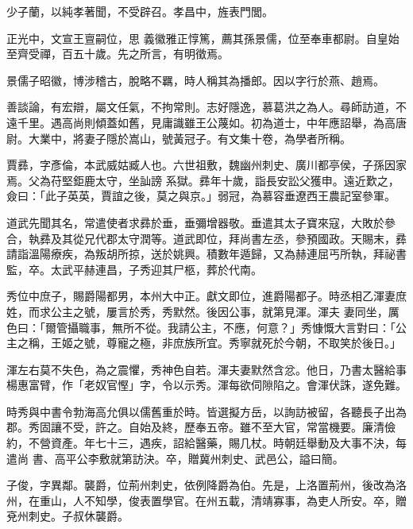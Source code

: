 \begin{pinyinscope}
 少子蘭，以純孝著聞，不受辟召。孝昌中，旌表門閭。



 正光中，文宣王亶嗣位，思
 義徽雅正惇篤，薦其孫景儒，位至奉車都尉。自皇始至齊受禪，百五十歲。先之所言，有明徵焉。



 景儒子昭徽，博涉稽古，脫略不羈，時人稱其為播郎。因以字行於燕、趙焉。



 善談論，有宏辯，屬文任氣，不拘常則。志好隱逸，慕葛洪之為人。尋師訪道，不遠千里。遇高尚則傾蓋如舊，見庸識雖王公蔑如。初為道士，中年應詔舉，為高唐尉。大業中，將妻子隱於嵩山，號黃冠子。有文集十卷，為學者所稱。



 賈彞，字彥倫，本武威姑臧人也。六世祖敷，魏幽州刺史、廣川都亭侯，子孫因家焉。父為苻堅鉅鹿太守，坐訕謗
 系獄。彞年十歲，詣長安訟父獲申。遠近歎之，僉曰：「此子英英，賈誼之後，莫之與京。」弱冠，為慕容垂遼西王農記室參軍。



 道武先聞其名，常遣使者求彞於垂，垂彌增器敬。垂遣其太子寶來寇，大敗於參合，執彞及其從兄代郡太守潤等。道武即位，拜尚書左丞，參預國政。天賜末，彞請詣溫陽療疾，為叛胡所掠，送於姚興。積數年遁歸，又為赫連屈丐所執，拜祕書監，卒。太武平赫連昌，子秀迎其尸柩，葬於代南。



 秀位中庶子，賜爵陽都男，本州大中正。獻文即位，進爵陽都子。時丞相乙渾妻庶姓，而求公主之號，屢言於秀，秀默然。後因公事，就第見渾。渾夫
 妻同坐，厲色曰：「爾管攝職事，無所不從。我請公主，不應，何意？」秀慷慨大言對曰：「公主之稱，王姬之號，尊寵之極，非庶族所宜。秀寧就死於今朝，不取笑於後日。」



 渾左右莫不失色，為之震懼，秀神色自若。渾夫妻默然含忿。他日，乃書太醫給事楊惠富臂，作「老奴官慳」字，令以示秀。渾每欲伺隙陷之。會渾伏誅，遂免難。



 時秀與中書令勃海高允俱以儒舊重於時。皆選擬方岳，以詢訪被留，各聽長子出為郡。秀固讓不受，許之。自始及終，歷奉五帝。雖不至大官，常當機要。廉清儉約，不營資產。年七十三，遇疾，詔給醫藥，賜几杖。時朝廷舉動及大事不決，每遣尚
 書、高平公李敷就第訪決。卒，贈冀州刺史、武邑公，謚曰簡。



 子俊，字異鄰。襲爵，位荊州刺史，依例降爵為伯。先是，上洛置荊州，後改為洛州，在重山，人不知學，俊表置學官。在州五載，清靖寡事，為吏人所安。卒，贈兗州刺史。子叔休襲爵。




\end{pinyinscope}
